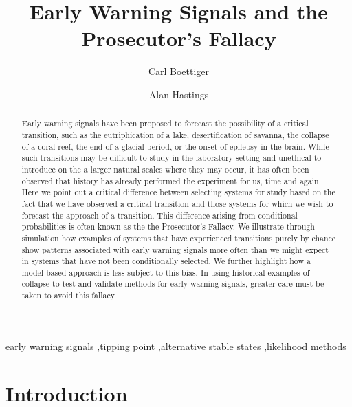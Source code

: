 \documentclass[authoryear,review,12pt]{elsarticle}
\begin{document}
\begin{frontmatter}
  \title{Early Warning Signals and the Prosecutor's Fallacy}
  \author[cpb]{Carl Boettiger}
  \author[esp]{Alan Hastings}
  \address[cpb]{Center for Population Biology, 1 Shields Avenue, University of California, Davis, CA, 95616 United States.}
  \address[esp]{Department of Environmental Science and Policy, University of California, Davis} 


  \begin{abstract}

  Early warning signals have been proposed to forecast the possibility of a 
  critical transition, such as the eutriphication of a lake, desertification
  of savanna, the collapse of a coral reef, the end of a glacial period, or 
  the onset of epilepsy in the brain.  While such transitions may be difficult
  to study in the laboratory setting and unethical to introduce on the a larger
  natural scales where they may occur, it has often been observed that history
  has already performed the experiment for us, time and again.  Here we point 
  out a critical difference between selecting systems for study based on the 
  fact that we have observed a critical transition and those systems for which
  we wish to forecast the approach of a transition. This difference arising
  from conditional probabilities is often known as the the Prosecutor's 
  Fallacy.  We illustrate through simulation how examples of systems that have 
  experienced transitions purely by chance show patterns associated with 
  early warning signals more often than we might expect in systems that have not
  been conditionally selected.  We further highlight how a model-based approach
  is less subject to this bias.  In using historical examples of collapse to 
  test and validate methods for early warning signals, greater care must be taken
  to avoid this fallacy.
 
  \end{abstract}

  \begin{keyword}
early warning signals \sep tipping point \sep alternative stable states \sep likelihood methods 
   \end{keyword}
 \end{frontmatter}

\section{Introduction}
\end{document}
